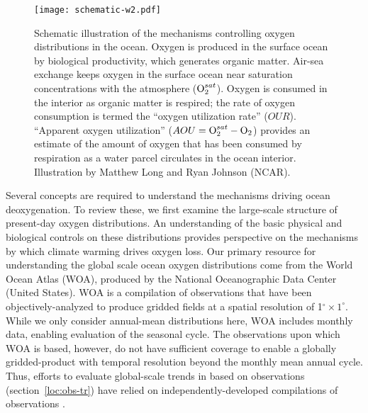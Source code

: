 \documentclass[draft,linenumbers]{report_chapter}
\begin{document}
\begin{figure}[p!]
\centering
\texttt{[image: schematic-w2.pdf]}
\caption{Schematic illustration of the mechanisms controlling oxygen distributions in the ocean.
Oxygen is produced in the surface ocean by biological productivity, which generates organic matter.
Air-sea exchange keeps oxygen in the surface ocean near saturation concentrations with the atmosphere ($\ce{O2}^{sat}$).
Oxygen is consumed in the interior as organic matter is respired; the rate of oxygen consumption is termed the ``oxygen utilization rate'' ($OUR$).
``Apparent oxygen utilization'' (${AOU = \ce{O2}^{sat} - \ce{O2}}$) provides an estimate of the amount of oxygen that has been consumed by respiration as a water parcel circulates in the ocean interior.
Illustration by Matthew Long and Ryan Johnson (NCAR).}
\label{fig:schematic}
\end{figure}

Several concepts are required to understand the mechanisms driving ocean deoxygenation.
To review these, we first examine the large-scale structure of present-day oxygen distributions.
An understanding of the basic physical and biological controls on these distributions provides perspective on the mechanisms by which climate warming drives oxygen loss.
Our primary resource for understanding the global scale ocean oxygen distributions come from the World Ocean Atlas (WOA), produced by the National Oceanographic Data Center (United States).
WOA is a compilation of observations that have been objectively-analyzed to produce gridded fields at a spatial resolution of 1$^\circ\times1^\circ$.
While we only consider annual-mean distributions here, WOA includes monthly data, enabling evaluation of the seasonal cycle.
The observations upon which WOA is based, however, do not have sufficient coverage to enable a globally gridded-product with temporal resolution beyond the monthly mean annual cycle.
Thus, efforts to evaluate global-scale trends in  based on observations (section~\ref{loc:obs-tr}) have relied on independently-developed compilations of observations \citep[e.g.,][]{Helm-Bindoff-etal-2011,Ito-Minobe-etal-2017,Schmidtko-Stramma-etal-2017}.
\end{document}
